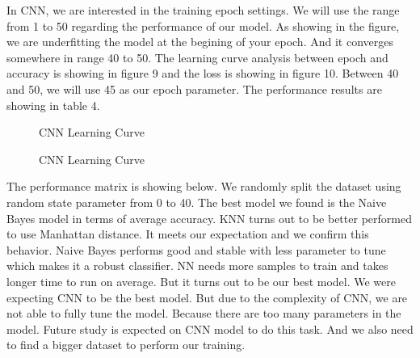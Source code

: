 \documentclass{article} %
\begin{document}
In CNN, we are interested in the training epoch settings. We will use the range from 1 to 50 regarding the performance of our model. As showing in the figure, we are underfitting the model at the begining of your epoch. And it converges somewhere in range 40 to 50. The learning curve analysis between epoch and accuracy is showing in figure 9 and the loss is showing in figure 10. Between 40 and 50, we will use 45 as our epoch parameter. The performance results are showing in table 4.

\begin{figure}[H]
\begin{center}
\caption{CNN Learning Curve}
\end{center}
\end{figure}



\begin{figure}[H]
\begin{center}
\caption{CNN Learning Curve}
\end{center}
\end{figure}

The performance matrix is showing below. We randomly split the dataset using random state parameter from 0 to 40. The best model we found is the Naive Bayes model in terms of average accuracy. KNN turns out to be better performed to use Manhattan distance. It meets our expectation and we confirm this behavior. Naive Bayes performs good and stable with less parameter to tune which makes it a robust classifier. NN needs more samples to train and takes longer time to run on average. But it turns out to be our best model. We were expecting CNN to be the best model. But due to the complexity of CNN, we are not able to fully tune the model. Because there are too many parameters in the model. Future study is expected on CNN model to do this task. And we also need to find a bigger dataset to perform our training. 
\end{document}
